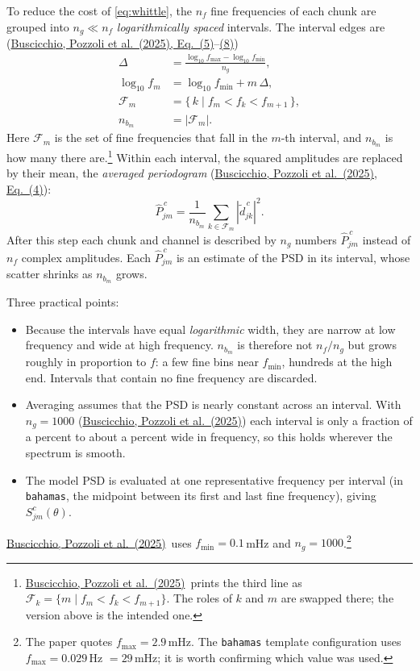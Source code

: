 \documentclass[11pt,a4paper]{article}
\newcommand{\urlPone}{https://arxiv.org/pdf/2511.03604}
\newcommand{\Pone}{\href{\urlPone}{Buscicchio, Pozzoli et al.~(2025)}}
\newcommand{\PoneEq}[1]{\href{\urlPone}{Buscicchio, Pozzoli et al.~(2025), Eq.~(#1)}}
\newcommand{\Pbar}{\hat{P}}
\begin{document}
To reduce the cost of \cref{eq:whittle}, the $n_f$ fine frequencies of each chunk
are grouped into $n_g\ll n_f$ \emph{logarithmically spaced} intervals. The interval
edges are (\PoneEq{5}--\href{\urlPone}{(8)})
\begin{align}
  \Delta &= \frac{\log_{10}f_{\max} - \log_{10}f_{\min}}{n_g},\\
  \log_{10} f_m &= \log_{10} f_{\min} + m\,\Delta,\\
  \mathcal{F}_m &= \{\,k \mid f_m < f_k < f_{m+1}\,\},\\
  n_{b_m} &= |\mathcal{F}_m|.
\end{align}
Here $\mathcal{F}_m$ is the set of fine frequencies that fall in the $m$-th interval,
and $n_{b_m}$ is how many there are.\footnote{\Pone\ prints the third line as
$\mathcal{F}_k=\{m\mid f_m<f_k<f_{m+1}\}$. The roles of $k$ and $m$ are swapped
there; the version above is the intended one.} Within each interval, the squared
amplitudes are replaced by their mean, the \emph{averaged periodogram}
(\PoneEq{4}):
\begin{equation}
  \Pbar^{\,c}_{jm} = \frac{1}{n_{b_m}}\sum_{k\in\mathcal{F}_m} |\tilde d^{\,c}_{jk}|^2 .
  \label{eq:phat}
\end{equation}
After this step each chunk and channel is described by $n_g$ numbers
$\Pbar^{\,c}_{jm}$ instead of $n_f$ complex amplitudes. Each $\Pbar^{\,c}_{jm}$ is an
estimate of the PSD in its interval, whose scatter shrinks as $n_{b_m}$ grows.

Three practical points:
\begin{itemize}
  \item Because the intervals have equal \emph{logarithmic} width, they are narrow at
        low frequency and wide at high frequency. $n_{b_m}$ is therefore not
        $n_f/n_g$ but grows roughly in proportion to $f$: a few fine bins near
        $f_{\min}$, hundreds at the high end. Intervals that contain no fine
        frequency are discarded.
  \item Averaging assumes that the PSD is nearly constant across an interval. With
        $n_g=1000$ (\Pone) each interval is only a fraction of a percent to about a
        percent wide in frequency, so this holds wherever the spectrum is smooth.
  \item The model PSD is evaluated at one representative frequency per interval
        (in \texttt{bahamas}, the midpoint between its first and last fine
        frequency), giving $S^c_{jm}(\theta)$.
\end{itemize}
\Pone\ uses $f_{\min}=0.1$\,mHz and $n_g=1000$.\footnote{The paper quotes
$f_{\max}=2.9$\,mHz. The \texttt{bahamas} template configuration uses
$f_{\max}=0.029$\,Hz $=29$\,mHz; it is worth confirming which value was used.}
\end{document}

